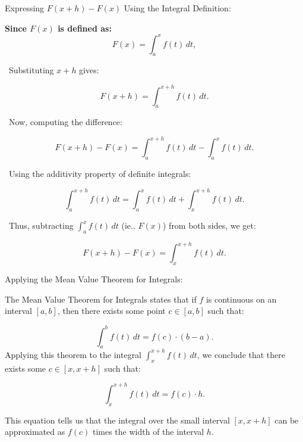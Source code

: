 \documentclass{beamer}
\begin{document}
\begin{frame}{Expressing \( F(x+h) - F(x) \) Using the Integral Definition:}

    \textbf{Since \( F(x) \) is defined as:}
    \tiny
    \[
    F(x) = \int_a^x f(t) \, dt,
    \]

  

\begin{adjustwidth}{5em}{0em}

    \textbullet\ Substituting \( x+h \) gives:
    
    \[
    F(x+h) = \int_a^{x+h} f(t) \, dt.
    \]

    \textbullet\ Now, computing the difference:

    \[
    F(x+h) - F(x) = \int_a^{x+h} f(t) \, dt - \int_a^x f(t) \, dt.
    \]

    \textbullet\ Using the additivity property of definite integrals:

    \[
    \int_a^{x+h} f(t) \, dt = \int_a^x f(t) \, dt + \int_x^{x+h} f(t) \, dt.
    \]

    \textbullet\ Thus, subtracting \( \int_a^x f(t) \, dt \) (ie.. \(F(x)\)) from both sides, we get:

    \[
    F(x+h) - F(x) = \int_x^{x+h} f(t) \, dt.
    \]
\end{adjustwidth}
\end{frame}
\newpage 



\begin{frame}{Applying the Mean Value Theorem for Integrals:}

The Mean Value Theorem for Integrals states that if \( f \) is continuous on an interval \( [a, b] \), then there exists some point \( c \in [a, b] \) such that:
\begin{adjustwidth}{5em}{0em}
    \footnotesize
    \[
    \int_a^b f(t) \, dt = f(c) \cdot (b-a).
    \]
    Applying this theorem to the integral \( \int_x^{x+h} f(t) \, dt \), we conclude that there exists some \( c \in [x, x+h] \) such that:

    \[
    \int_x^{x+h} f(t) \, dt = f(c) \cdot h.
    \]

    This equation tells us that the integral over the small interval \( [x, x+h] \) can be approximated as \( f(c) \) times the width of the interval \( h \).
    \end{adjustwidth}
\end{frame}
\newpage
\end{document}
